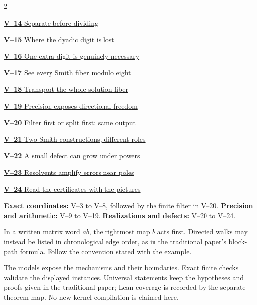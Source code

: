 \documentclass[11pt,a4paper]{article}
\newcommand{\head}[1]{\par\vspace{2pt}{\sffamily\bfseries\normalsize #1}\par\vspace{1pt}}
\begin{document}
\begin{multicols}{2}
{\small\noindent\hyperlink{vpage14}{\textbf{V--14} Separate before dividing}\par\smallskip}
{\small\noindent\hyperlink{vpage15}{\textbf{V--15} Where the dyadic digit is lost}\par\smallskip}
{\small\noindent\hyperlink{vpage16}{\textbf{V--16} One extra digit is genuinely necessary}\par\smallskip}
{\small\noindent\hyperlink{vpage17}{\textbf{V--17} See every Smith fiber modulo eight}\par\smallskip}
{\small\noindent\hyperlink{vpage18}{\textbf{V--18} Transport the whole solution fiber}\par\smallskip}
{\small\noindent\hyperlink{vpage19}{\textbf{V--19} Precision exposes directional freedom}\par\smallskip}
{\small\noindent\hyperlink{vpage20}{\textbf{V--20} Filter first or split first: same output}\par\smallskip}
{\small\noindent\hyperlink{vpage21}{\textbf{V--21} Two Smith constructions, different roles}\par\smallskip}
{\small\noindent\hyperlink{vpage22}{\textbf{V--22} A small defect can grow under powers}\par\smallskip}
{\small\noindent\hyperlink{vpage23}{\textbf{V--23} Resolvents amplify errors near poles}\par\smallskip}
{\small\noindent\hyperlink{vpage24}{\textbf{V--24} Read the certificates with the pictures}\par\smallskip}

\end{multicols}
\medskip
\head{Three reading routes}
\textbf{Exact coordinates:} V--3 to V--8, followed by the finite filter in V--20.
\textbf{Precision and arithmetic:} V--9 to V--19.
\textbf{Realizations and defects:} V--20 to V--24.
\head{How to read an ordered product}
In a written matrix word $ab$, the rightmost map $b$ acts first. Directed
walks may instead be listed in chronological edge order, as in the traditional
paper's block-path formula. Follow the convention stated with the example.
\head{What the figures establish}
The models expose the mechanisms and their boundaries. Exact finite checks
validate the displayed instances. Universal statements keep the hypotheses
and proofs given in the traditional paper; Lean coverage is recorded by the
separate theorem map. No new kernel compilation is claimed here.
\clearpage
{}

\end{document}
